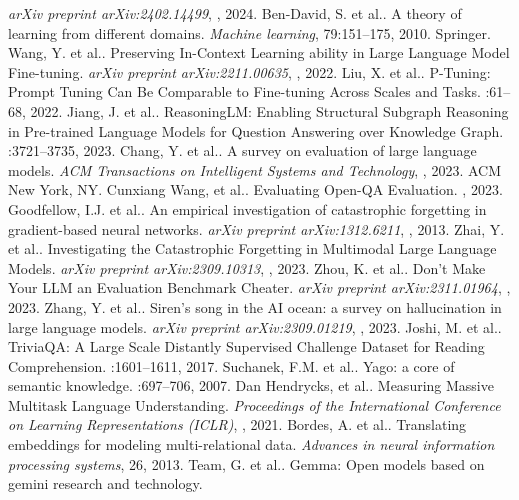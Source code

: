\begin{thebibliography}{10}
\begin{small}
\newblock \emph{arXiv preprint arXiv:2402.14499}, , 2024.
 Ben-David, S. et al.. 
\newblock A theory of learning from different domains. 
\newblock \emph{Machine learning}, 79:151--175, 2010. Springer.
 Wang, Y. et al.. 
\newblock Preserving In-Context Learning ability in Large Language Model Fine-tuning. 
\newblock \emph{arXiv preprint arXiv:2211.00635}, , 2022.
 Liu, X. et al.. 
\newblock P-Tuning: Prompt Tuning Can Be Comparable to Fine-tuning Across Scales and Tasks. 
:61--68, 2022.
 Jiang, J. et al.. 
\newblock ReasoningLM: Enabling Structural Subgraph Reasoning in Pre-trained Language Models for Question Answering over Knowledge Graph. 
:3721--3735, 2023.
 Chang, Y. et al.. 
\newblock A survey on evaluation of large language models. 
\newblock \emph{ACM Transactions on Intelligent Systems and Technology}, , 2023. ACM New York, NY.
 Cunxiang Wang,  et al.. 
\newblock Evaluating Open-{QA} Evaluation. 
, 2023.
 Goodfellow, I.J. et al.. 
\newblock An empirical investigation of catastrophic forgetting in gradient-based neural networks. 
\newblock \emph{arXiv preprint arXiv:1312.6211}, , 2013.
 Zhai, Y. et al.. 
\newblock Investigating the Catastrophic Forgetting in Multimodal Large Language Models. 
\newblock \emph{arXiv preprint arXiv:2309.10313}, , 2023.
 Zhou, K. et al.. 
\newblock Don't Make Your LLM an Evaluation Benchmark Cheater. 
\newblock \emph{arXiv preprint arXiv:2311.01964}, , 2023.
 Zhang, Y. et al.. 
\newblock Siren's song in the AI ocean: a survey on hallucination in large language models. 
\newblock \emph{arXiv preprint arXiv:2309.01219}, , 2023.
 Joshi, M. et al.. 
\newblock TriviaQA: A Large Scale Distantly Supervised Challenge Dataset for Reading Comprehension. 
:1601--1611, 2017.
 Suchanek, F.M. et al.. 
\newblock Yago: a core of semantic knowledge. 
:697--706, 2007.
 Dan Hendrycks,  et al.. 
\newblock Measuring Massive Multitask Language Understanding. 
\newblock \emph{Proceedings of the International Conference on Learning Representations (ICLR)}, , 2021.
 Bordes, A. et al.. 
\newblock Translating embeddings for modeling multi-relational data. 
\newblock \emph{Advances in neural information processing systems}, 26, 2013.
 Team, G. et al.. 
\newblock Gemma: Open models based on gemini research and technology. 

\end{small}
\end{thebibliography}
